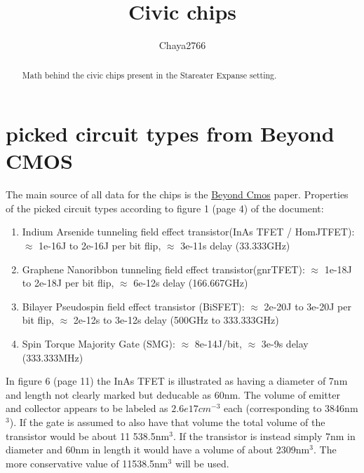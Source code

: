 \documentclass[a4paper]{article}
\title{Civic chips}
\author{Chaya2766}
\begin{document}
	\sffamily
	\sloppy
	
	\maketitle
	
	\vfill
	
	\begin{abstract}
		Math behind the civic chips present in the Stareater Expanse setting.
	\end{abstract}
	
	\vfill
	
	\tableofcontents
	
	\pagebreak
	
	\section{picked circuit types from Beyond CMOS}
	
	The main source of all data for the chips is the \href{https://arxiv.org/abs/1302.0244}{Beyond Cmos} paper. Properties of the picked circuit types according to figure 1 (page 4) of the document:
	
	\begin{enumerate}
		\item Indium Arsenide tunneling field effect transistor(InAs TFET / HomJTFET): $\approx$ 1e-16J to 2e-16J per bit flip, $\approx$ 3e-11s delay (33.333GHz)
		
		\item Graphene Nanoribbon tunneling field effect transistor(gnrTFET): $\approx$ 1e-18J to 2e-18J per bit flip, $\approx$ 6e-12s delay (166.667GHz)
		
		\item Bilayer Pseudospin field effect transistor (BiSFET): $\approx$ 2e-20J to 3e-20J per bit flip, $\approx$ 2e-12s to 3e-12s delay (500GHz to 333.333GHz)
		
		\item Spin Torque Majority Gate (SMG): $\approx$ 8e-14J/bit, $\approx$ 3e-9s delay (333.333MHz)
	\end{enumerate}
	
	In figure 6 (page 11) the InAs TFET is illustrated as having a diameter of 7nm and length not clearly marked but deducable as 60nm. The volume of emitter and collector appears to be labeled as $2.6e17cm^{-3}$ each (corresponding to 3846nm$^3$). If the gate is assumed to also have that volume the total volume of the transistor would be about 11 538.5nm$^3$. If the transistor is instead simply 7nm in diameter and 60nm in length it would have a volume of about 2309nm$^3$. The more conservative value of 11538.5nm$^3$ will be used.
	
\end{document}
